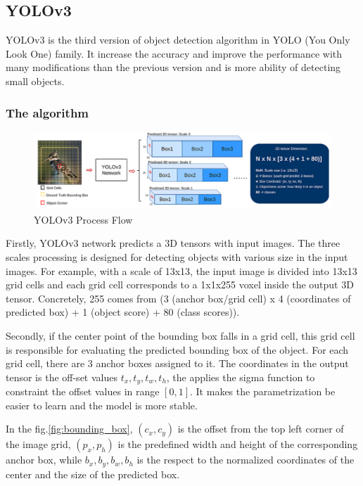 \subsection{YOLOv3}
\hspace{0.5cm}YOLOv3 is the third version of object detection algorithm in YOLO (You Only Look One) family. It increase the accuracy and improve the performance with many modifications than the previous version and is more ability of detecting small objects.\par
\subsubsection{The algorithm}
\begin{figure}[h!]
    \centering
    \includegraphics[width=\textwidth]{Chapters/Fig/yolo_algo.png}
    \caption{YOLOv3 Process Flow}
    \label{fig:1}
\end{figure}
\par
Firstly, YOLOv3 network predicts a 3D tensors with input images. The three scales processing is designed for detecting objects with various size in the input images. For example, with a scale of 13x13, the input image is divided into 13x13 grid cells and each grid cell corresponds to a 1x1x255 voxel inside the output 3D tensor. Concretely, 255 comes from (3 (anchor box/grid cell) x 4 (coordinates of predicted box) + 1 (object score) + 80 (class scores)).\par
Secondly, if the center point of the bounding box falls in a grid cell, this grid cell is responsible for evaluating the predicted bounding box of the object. For each grid cell, there are 3 anchor boxes assigned to it. The coordinates in the output tensor is the off-set values $t_x, t_y, t_w, t_h$, the applies the sigma function to constraint the offset values in range $[0,1]$. It makes the parametrization be easier to learn and the model is more stable\cite{Redmon_2017_CVPR}. \par In the fig.\ref{fig:bounding_box}, $(c_x, c_y)$ is the offset from the top left corner of the image grid, $(p_x, p_h)$ is the predefined width and height of the corresponding anchor box, while $b_x,b_y,b_w,b_h$ is the respect to the normalized coordinates of the center and the size of the predicted box.

